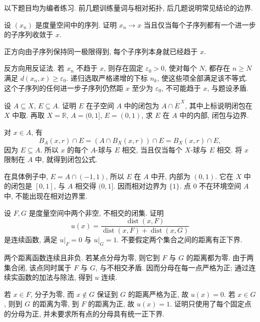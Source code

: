 \label{ch:seq:exercises}
以下题目均为编者练习. 前几题训练量词与相对拓扑, 后几题说明常见结论的边界.

\begin{exercise}\label{ch:seq:ex-subsequence}
设 $(x_n)$ 是度量空间中的序列. 证明 $x_n\to x$ 当且仅当每个子序列都有一个进一步的子序列收敛于 $x$.
\end{exercise}
\begin{solution}
正方向由子序列保持同一极限得到, 每个子序列本身就已经趋于 $x$.

反方向用反证法. 若 $x_n$ 不趋于 $x$, 则存在固定 $\varepsilon_0>0$, 使对每个 $N$, 都存在 $n\ge N$ 满足 $d(x_n,x)\ge\varepsilon_0$. 递归选取严格递增的下标 $n_k$, 使这些项全部满足该不等式. 这个子序列的任何进一步子序列仍然距 $x$ 至少为 $\varepsilon_0$, 不可能趋于 $x$, 与题设矛盾.
\end{solution}

\begin{exercise}\label{ch:seq:ex-relative-closure}
设 $A\subseteq X$, $E\subseteq A$. 证明 $E$ 在子空间 $A$ 中的闭包为 $A\cap\overline E^{\,X}$, 其中上标说明闭包在 $X$ 中取. 再取 $X=\mathbb{R}$, $A=(0,1]$, $E=(0,1)$, 求 $E$ 在 $A$ 中的内部, 闭包与边界.
\end{exercise}
\begin{solution}
对 $x\in A$, 有
\[
 B_A(x,r)\cap E=(A\cap B_X(x,r))\cap E=B_X(x,r)\cap E,
\]
因为 $E\subseteq A$. 所以 $x$ 的每个 $A$-球与 $E$ 相交, 当且仅当每个 $X$-球与 $E$ 相交. 将 $x$ 限制在 $A$ 中, 就得到闭包公式.

在具体例子中, $E=A\cap(-1,1)$, 所以 $E$ 在 $A$ 中开, 内部为 $(0,1)$. 它在 $X$ 中的闭包是 $[0,1]$, 与 $A$ 相交得 $(0,1]$. 因而相对边界为 $\{1\}$. 点 $0$ 不在环境空间 $A$ 中, 不能出现在相对边界里.
\end{solution}

\begin{exercise}\label{ch:seq:ex-separation}
设 $F,G$ 是度量空间中两个非空, 不相交的闭集. 证明
\[
 u(x)=\frac{\operatorname{dist}(x,F)}
 {\operatorname{dist}(x,F)+\operatorname{dist}(x,G)}
\]
是连续函数, 满足 $u|_F=0$ 与 $u|_G=1$. 不要假定两个集合之间的距离有正下界.
\end{exercise}
\begin{solution}
两个距离函数连续且非负. 若某点分母为零, 则它到 $F$ 与 $G$ 的距离都为零. 由于两集合闭, 该点同时属于 $F$ 与 $G$, 与不相交矛盾. 因而分母在每一点严格为正; 通过连续实函数的加法与除法, 得到 $u$ 连续.

若 $x\in F$, 分子为零, 而 $x\notin G$ 保证到 $G$ 的距离严格为正, 故 $u(x)=0$. 若 $x\in G$, 则到 $G$ 的距离为零, 到 $F$ 的距离为正, 故 $u(x)=1$. 证明只使用了每个固定点的分母为正, 并未要求所有点的分母具有统一正下界.
\end{solution}

